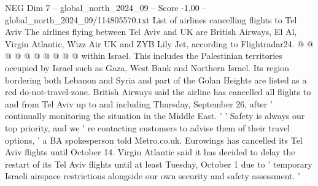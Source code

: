 \begin{textsample}{NEG Dim 7 – global\_north\_2024\_09 – Score -1.00 – global\_north\_2024\_09/114805570.txt}
List of airlines cancelling flights to Tel Aviv The airlines flying between Tel Aviv and UK are British Airways, El Al, Virgin Atlantic, Wizz Air UK and ZYB Lily Jet, according to Flightradar24. @ @ @ @ @ @ @ @ @ @ within Israel.
This includes the Palestinian territories occupied by Israel such as Gaza, West Bank and Northern Israel.
Its region bordering both Lebanon and Syria and part of the Golan Heights are listed as a red do-not-travel-zone.
British Airways said the airline has cancelled all flights to and from Tel Aviv up to and including Thursday, September 26, after ' continually monitoring the situation in the Middle East. ' ' Safety is always our top priority, and we ' re contacting customers to advise them of their travel options, ' a BA spokesperson told Metro.co.uk.
Eurowings has cancelled its Tel Aviv flights until October 14.
Virgin Atlantic said it has decided to delay the restart of its Tel Aviv flights until at least Tuesday, October 1 due to ' temporary Israeli airspace restrictions alongside our own security and safety assessment. '

\end{textsample}
